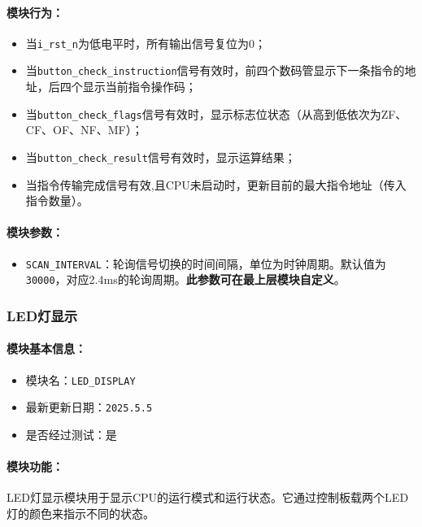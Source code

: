 \documentclass[lang=cn,a4paper,newtx]{elegantpaper}
\begin{document}
\paragraph{模块行为：}
\begin{itemize}
  \item 当\texttt{i\_rst\_n}为低电平时，所有输出信号复位为0；
  \item 当\texttt{button\_check\_instruction}信号有效时，前四个数码管显示下一条指令的地址，后四个显示当前指令操作码；
  \item 当\texttt{button\_check\_flags}信号有效时，显示标志位状态（从高到低依次为ZF、CF、OF、NF、MF）；
  \item 当\texttt{button\_check\_result}信号有效时，显示运算结果；
  \item 当指令传输完成信号有效,且CPU未启动时，更新目前的最大指令地址（传入指令数量）。
\end{itemize}
\paragraph{模块参数：}
\begin{itemize}
  \item \texttt{SCAN\_INTERVAL}：轮询信号切换的时间间隔，单位为时钟周期。默认值为\texttt{30000}，对应2.4ms的轮询周期。\textbf{此参数可在最上层模块自定义}。
\end{itemize}
\subsubsection{LED灯显示}
\paragraph{模块基本信息：}
\begin{itemize}
  \item 模块名：\texttt{LED\_DISPLAY}
  \item 最新更新日期：\texttt{2025.5.5}
  \item 是否经过测试：是
\end{itemize}
\paragraph{模块功能：}
LED灯显示模块用于显示CPU的运行模式和运行状态。它通过控制板载两个LED灯的颜色来指示不同的状态。
\end{document}
